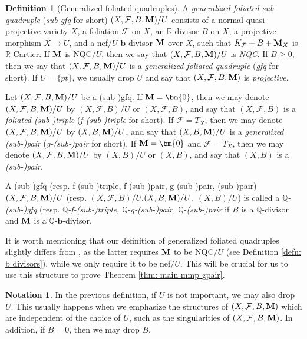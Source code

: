 \documentclass[11pt]{amsart}
\numberwithin{equation}{section}
\newcommand{\bb}{\bm{b}}
\newcommand{\Mm}{{\bf{M}}}
\newcommand{\Rr}{\mathbb{R}}
\newcommand{\Ff}{\mathcal{F}}
\theoremstyle{definition}
\newtheorem{defn}[thm]{Definition}
\theoremstyle{definition}
\newtheorem{nota}[thm]{Notation}
\theoremstyle{definition}
\begin{document}
\begin{defn}[Generalized foliated quadruples]\label{defn: gfq}
A \emph{generalized foliated sub-quadruple} (\emph{sub-gfq} for short) $(X,\Ff,B,\Mm)/U$ consists of a normal quasi-projective variety $X$, a foliation $\Ff$ on $X$, an $\Rr$-divisor $B$ on $X$, a projective morphism $X\rightarrow U$, and a nef$/U$ $\bb$-divisor $\Mm$ over $X$, such that $K_{\Ff}+B+\Mm_X$ is $\mathbb R$-Cartier. If $\Mm$ is NQC$/U$, then we say that $(X,\Ff,B,\Mm)/U$ is \emph{NQC}. If $B\geq 0$, then we say that $(X,\Ff,B,\Mm)/U$ is a \emph{generalized foliated quadruple} (\emph{gfq} for short). If $U=\{pt\}$, we usually drop $U$ and say that $(X,\Ff,B,\Mm)$ is \emph{projective}. 

Let $(X,\Ff,B,\Mm)/U$ be a (sub-)gfq. If $\Mm=\bm{0}$, then we may denote $(X,\Ff,B,\Mm)/U$ by $(X,\Ff,B)/U$ or $(X,\Ff,B)$, and say that $(X,\Ff,B)$ is a \emph{foliated (sub-)triple} (\emph{f-(sub-)triple} for short). If $\Ff=T_X$, then we may denote $(X,\Ff,B,\Mm)/U$ by $(X,B,\Mm)/U$, and say that $(X,B,\Mm)/U$ is a \emph{generalized (sub-)pair} (\emph{g-(sub-)pair} for short). If $\Mm=\bm{0}$ and $\Ff=T_X$, then we may denote $(X,\Ff,B,\Mm)/U$ by $(X,B)/U$ or $(X,B)$, and say that $(X,B)$ is a \emph{(sub-)pair}. 

A (sub-)gfq (resp. f-(sub-)triple, f-(sub-)pair, g-(sub-)pair, (sub-)pair) $(X,\Ff,B,\Mm)/U$ (resp. $(X,\Ff,B)/U$,$(X,B,\Mm)/U$, $(X,B)/U$) is called a \emph{$\mathbb Q$-(sub-)gfq} (resp. \emph{$\mathbb Q$-f-(sub-)triple, $\mathbb Q$-g-(sub-)pair, $\mathbb Q$-(sub-)pair} if $B$ is a $\mathbb Q$-divisor and $\Mm$ is a $\mathbb Q$-$\bb$-divisor.

It is worth mentioning that our definition of generalized foliated quadruples slightly differs from \cite[Definition 1.2]{LLM23}, as the latter requires $\Mm$ to be NQC$/U$ (see Definition \ref{defn: b divisors}), while we only require it to be nef$/U$.  This will be crucial for us to use this structure to prove Theorem \ref{thm: main mmp gpair}.
\end{defn}

\begin{nota}
In the previous definition, if $U$ is not important, we may also drop $U$. This usually happens when we emphasize the structures of $(X,\Ff,B,\Mm)$ which are independent of the choice of $U$, such as the singularities of $(X,\Ff,B,\Mm)$. In addition, if $B=0$, then we may drop $B$.
\end{nota}
\end{document}
